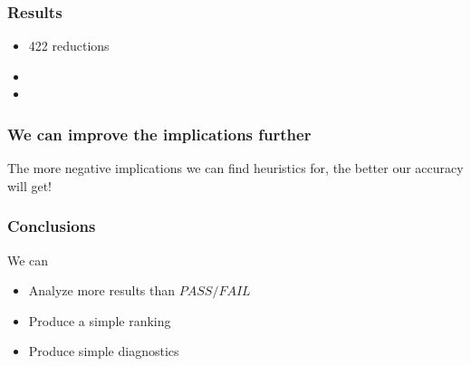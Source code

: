 \documentclass[svgnames,14pt]{beamer}
\newcommand\fail{\mathit{FAIL}}
\newcommand\pass{\mathit{PASS}}
\theoremstyle{definition}
\begin{document}
\begin{frame}
\frametitle{Results}
\begin{itemize}
\item 422 reductions
\item {} 
\item {}
\end{itemize}
\end{frame}

\begin{frame}
\frametitle{We can improve the implications further}
The more negative implications we can find heuristics for, the better our accuracy will get!
\end{frame}

\begin{frame}
\frametitle{Conclusions}
We can
\begin{itemize}
\item<2-> Analyze more results than $\pass/\fail$
\item<3-> Produce a simple ranking 
\item<4-> Produce simple diagnostics 
\end{itemize}
\end{frame}
\end{document}
